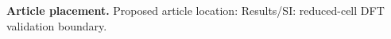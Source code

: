 \textbf{Article placement.} Proposed article location: Results/SI: reduced-cell DFT validation boundary.
